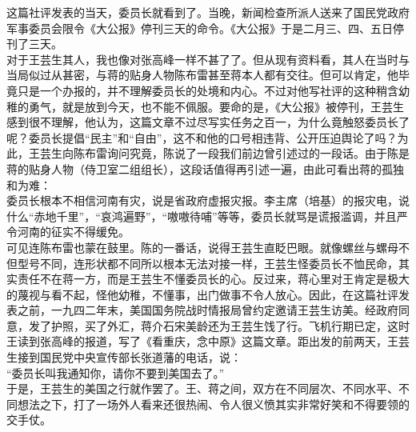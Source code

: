 这篇社评发表的当天，委员长就看到了。当晚，新闻检查所派人送来了国民党政府军事委员会限令《大公报》停刊三天的命令。《大公报》于是二月三、四、五日停刊了三天。\\

对于王芸生其人，我也像对张高峰一样不甚了了。但从现有资料看，其人在当时与当局似过从甚密，与蒋的贴身人物陈布雷甚至蒋本人都有交往。但可以肯定，他毕竟只是一个办报的，并不理解委员长的处境和内心。不过对他写社评的这种稍含幼稚的勇气，就是放到今天，也不能不佩服。要命的是，《大公报》被停刊，王芸生感到很不理解，他认为，这篇文章不过尽写实任务之百一，为什么竟触怒委员长了呢？委员长提倡“民主”和“自由”，这不和他的口号相违背、公开压迫舆论了吗？为此，王芸生向陈布雷询问究竟，陈说了一段我们前边曾引述过的一段话。由于陈是蒋的贴身人物（侍卫室二组组长），这段话值得再引述一遍，由此可看出蒋的孤独和为难：\\

委员长根本不相信河南有灾，说是省政府虚报灾报。李主席（培基）的报灾电，说什么“赤地千里”，“哀鸿遍野”，“嗷嗷待哺”等等，委员长就骂是谎报滥调，并且严令河南的征实不得缓免。\\

可见连陈布雷也蒙在鼓里。陈的一番话，说得王芸生直眨巴眼。就像螺丝与螺母不但型号不同，连形状都不同所以根本无法对接一样，王芸生怪委员长不恤民命，其实责任不在蒋一方，而是王芸生不懂委员长的心。反过来，蒋心里对王肯定是极大的蔑视与看不起，怪他幼稚，不懂事，出门做事不令人放心。因此，在这篇社评发表之前，一九四二年末，美国国务院战时情报局曾约定邀请王芸生访美。经政府同意，发了护照，买了外汇，蒋介石宋美龄还为王芸生饯了行。飞机行期已定，这时王读到张高峰的报道，写了《看重庆，念中原》这篇文章。距出发的前两天，王芸生接到国民党中央宣传部长张道藩的电话，说：\\

“委员长叫我通知你，请你不要到美国去了。”\\

于是，王芸生的美国之行就作罢了。王、蒋之间，双方在不同层次、不同水平、不同想法之下，打了一场外人看来还很热闹、令人很义愤其实非常好笑和不得要领的交手仗。\\

